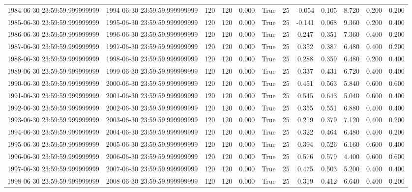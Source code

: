 \begin{table}
\begin{tabular}{lccccccccccc}
1984-06-30 23:59:59.999999999 & 1994-06-30 23:59:59.999999999 & 120 & 120 & 0.000 & True & 25 & -0.054 & 0.105 & 8.720 & 0.200 & 0.200 \\
1985-06-30 23:59:59.999999999 & 1995-06-30 23:59:59.999999999 & 120 & 120 & 0.000 & True & 25 & -0.141 & 0.068 & 9.360 & 0.200 & 0.400 \\
1986-06-30 23:59:59.999999999 & 1996-06-30 23:59:59.999999999 & 120 & 120 & 0.000 & True & 25 & 0.247 & 0.351 & 7.360 & 0.400 & 0.200 \\
1987-06-30 23:59:59.999999999 & 1997-06-30 23:59:59.999999999 & 120 & 120 & 0.000 & True & 25 & 0.352 & 0.387 & 6.480 & 0.400 & 0.200 \\
1988-06-30 23:59:59.999999999 & 1998-06-30 23:59:59.999999999 & 120 & 120 & 0.000 & True & 25 & 0.288 & 0.359 & 6.480 & 0.200 & 0.400 \\
1989-06-30 23:59:59.999999999 & 1999-06-30 23:59:59.999999999 & 120 & 120 & 0.000 & True & 25 & 0.337 & 0.431 & 6.720 & 0.400 & 0.400 \\
1990-06-30 23:59:59.999999999 & 2000-06-30 23:59:59.999999999 & 120 & 120 & 0.000 & True & 25 & 0.451 & 0.563 & 5.840 & 0.600 & 0.600 \\
1991-06-30 23:59:59.999999999 & 2001-06-30 23:59:59.999999999 & 120 & 120 & 0.000 & True & 25 & 0.545 & 0.643 & 5.040 & 0.600 & 0.400 \\
1992-06-30 23:59:59.999999999 & 2002-06-30 23:59:59.999999999 & 120 & 120 & 0.000 & True & 25 & 0.355 & 0.551 & 6.880 & 0.400 & 0.400 \\
1993-06-30 23:59:59.999999999 & 2003-06-30 23:59:59.999999999 & 120 & 120 & 0.000 & True & 25 & 0.219 & 0.379 & 7.120 & 0.400 & 0.200 \\
1994-06-30 23:59:59.999999999 & 2004-06-30 23:59:59.999999999 & 120 & 120 & 0.000 & True & 25 & 0.322 & 0.464 & 6.480 & 0.400 & 0.200 \\
1995-06-30 23:59:59.999999999 & 2005-06-30 23:59:59.999999999 & 120 & 120 & 0.000 & True & 25 & 0.394 & 0.526 & 6.160 & 0.600 & 0.400 \\
1996-06-30 23:59:59.999999999 & 2006-06-30 23:59:59.999999999 & 120 & 120 & 0.000 & True & 25 & 0.576 & 0.579 & 4.400 & 0.600 & 0.600 \\
1997-06-30 23:59:59.999999999 & 2007-06-30 23:59:59.999999999 & 120 & 120 & 0.000 & True & 25 & 0.475 & 0.503 & 5.200 & 0.400 & 0.400 \\
1998-06-30 23:59:59.999999999 & 2008-06-30 23:59:59.999999999 & 120 & 120 & 0.000 & True & 25 & 0.319 & 0.412 & 6.640 & 0.400 & 0.200 \\

\end{tabular}
\end{table}
